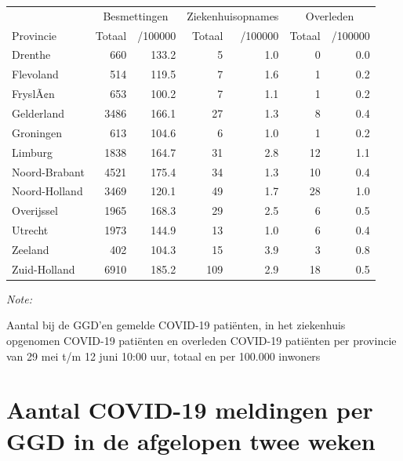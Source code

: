 \documentclass[
  english,
  man,floatsintext]{apa6}
\begin{document}
\begin{table}
\centering
\begin{threeparttable}
\begin{tabular}{lrrrrrr}
\toprule
\multicolumn{1}{c}{ } & \multicolumn{2}{c}{Besmettingen} & \multicolumn{2}{c}{Ziekenhuisopnames} & \multicolumn{2}{c}{Overleden} \\
\cmidrule(l{3pt}r{3pt}){2-3} \cmidrule(l{3pt}r{3pt}){4-5} \cmidrule(l{3pt}r{3pt}){6-7}
Provincie & Totaal & /100000 & Totaal & /100000 & Totaal & /100000\\
\midrule
Drenthe & 660 & 133.2 & 5 & 1.0 & 0 & 0.0\\
Flevoland & 514 & 119.5 & 7 & 1.6 & 1 & 0.2\\
FryslÃ¢n & 653 & 100.2 & 7 & 1.1 & 1 & 0.2\\
Gelderland & 3486 & 166.1 & 27 & 1.3 & 8 & 0.4\\
Groningen & 613 & 104.6 & 6 & 1.0 & 1 & 0.2\\
Limburg & 1838 & 164.7 & 31 & 2.8 & 12 & 1.1\\
Noord-Brabant & 4521 & 175.4 & 34 & 1.3 & 10 & 0.4\\
Noord-Holland & 3469 & 120.1 & 49 & 1.7 & 28 & 1.0\\
Overijssel & 1965 & 168.3 & 29 & 2.5 & 6 & 0.5\\
Utrecht & 1973 & 144.9 & 13 & 1.0 & 6 & 0.4\\
Zeeland & 402 & 104.3 & 15 & 3.9 & 3 & 0.8\\
Zuid-Holland & 6910 & 185.2 & 109 & 2.9 & 18 & 0.5\\
\bottomrule
\end{tabular}
\begin{tablenotes}
\item \textit{Note: } 
\item Aantal bij de GGD’en gemelde COVID-19 patiënten, in het ziekenhuis opgenomen COVID-19 patiënten en overleden COVID-19 patiënten per provincie van 29 mei t/m 12 juni 10:00 uur, totaal en per 100.000 inwoners
\end{tablenotes}
\end{threeparttable}
\end{table}

\newpage

\hypertarget{aantal-covid-19-meldingen-per-ggd-in-de-afgelopen-twee-weken}{%
\section{Aantal COVID-19 meldingen per GGD in de afgelopen twee weken}\label{aantal-covid-19-meldingen-per-ggd-in-de-afgelopen-twee-weken}}
\end{document}
